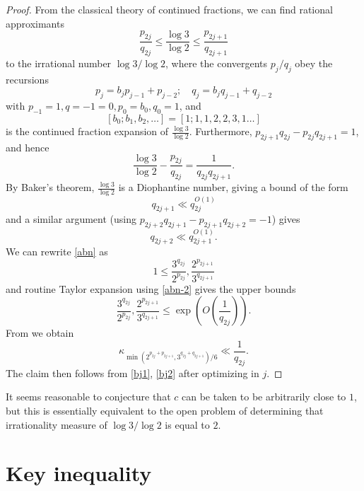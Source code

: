 \documentclass[12pt,a4paper,reqno]{amsart}
\numberwithin{equation}{section}
\theoremstyle{plain}
\theoremstyle{definition}
\begin{document}
\begin{proof}  From the classical theory of continued fractions, we can find rational approximants
\begin{equation}\label{abn}
 \frac{p_{2j}}{q_{2j}} \leq \frac{\log 3}{\log 2} \leq \frac{p_{2j+1}}{q_{2j+1}}
\end{equation}
to the irrational number $\log 3/\log 2$, where the convergents $p_j/q_j$ obey the recursions
$$ p_j = b_j p_{j-1} + p_{j-2}; \quad q_j = b_j q_{j-1} + q_{j-2}$$
with $p_{-1} = 1, q={-1}=0, p_0 = b_0, q_0=1$, and 
$$[b_0;b_1,b_2,\dots] = [1;1,1,2,2,3,1\dots]$$ 
is the continued fraction expansion of $\frac{\log 3}{\log 2}$.  Furthermore, $p_{2j+1}q_{2j} - p_{2j} q_{2j+1} = 1$, and hence
\begin{equation}\label{abn-2} 
  \frac{\log 3}{\log 2} - \frac{p_{2j}}{q_{2j}} = \frac{1}{q_{2j} q_{2j+1}}.
\end{equation}
By Baker's theorem, $\frac{\log 3}{\log 2}$ is a Diophantine number, giving a bound of the form
\begin{equation}\label{bj1}
   q_{2j+1} \ll q_{2j}^{O(1)}
\end{equation}
and a similar argument (using $p_{2j+2} q_{2j+1}-p_{2j+1} q_{2j+2} = -1$) gives
\begin{equation}\label{bj2}
 q_{2j+2} \ll q_{2j+1}^{O(1)}.
\end{equation}
We can rewrite \eqref{abn} as
$$ 1 \leq \frac{3^{q_{2j}}}{2^{p_{2j}}}, \frac{2^{p_{2j+1}}}{3^{q_{2j+1}}}$$
and routine Taylor expansion using \eqref{abn-2} gives the upper bounds
$$ \frac{3^{q_{2j}}}{2^{p_{2j}}}, \frac{2^{p_{2j+1}}}{3^{q_{2j+1}}}\leq \exp\left( O\left( \frac{1}{q_{2j}}\right)\right).$$
From  we obtain
$$
\kappa_{\min(2^{p_{2j} + p_{2j+1}}, 3^{q_{2j}+q_{2j+1}})/6} \ll \frac{1}{q_{2j}}.$$
The claim then follows from \eqref{bj1}, \eqref{bj2} after optimizing in $j$.

\end{proof}


It seems reasonable to conjecture that $c$ can be taken to be arbitrarily close to $1$, but this is essentially equivalent to the open problem of determining that irrationality measure of $\log 3 / \log 2$ is equal to $2$.


\section{Key inequality}\label{key-app}
\end{document}
